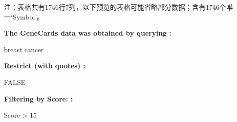 \documentclass[
]{article}
\begin{document}
\begin{center}\begin{tcolorbox}[colback=gray!10, colframe=gray!50, width=0.9\linewidth, arc=1mm, boxrule=0.5pt]注：表格共有1746行7列，以下预览的表格可能省略部分数据；含有1746个唯一`Symbol'。
\end{tcolorbox}
\end{center}\begin{center}\begin{tcolorbox}[colback=gray!10, colframe=gray!50, width=0.9\linewidth, arc=1mm, boxrule=0.5pt]
\textbf{
The GeneCards data was obtained by querying
:}

\vspace{0.5em}

    breast cancer

\vspace{2em}


\textbf{
Restrict (with quotes)
:}

\vspace{0.5em}

    FALSE

\vspace{2em}


\textbf{
Filtering by Score:
:}

\vspace{0.5em}

    Score > 15

\vspace{2em}
\end{tcolorbox}
\end{center}
\end{document}
